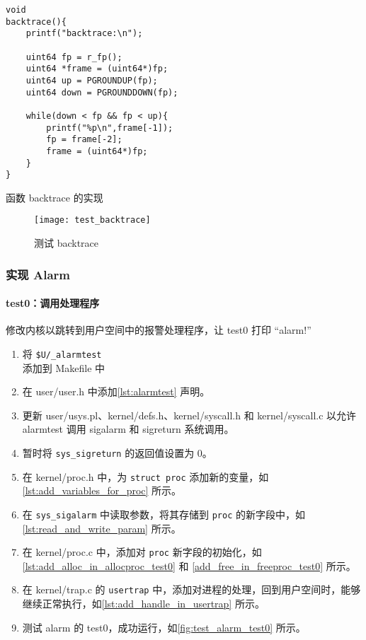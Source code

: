 \begin{listing}[!htb]
	\begin{verbatim}
void
backtrace(){
    printf("backtrace:\n");
   
    uint64 fp = r_fp();
    uint64 *frame = (uint64*)fp;
    uint64 up = PGROUNDUP(fp);
    uint64 down = PGROUNDDOWN(fp);

    while(down < fp && fp < up){
        printf("%p\n",frame[-1]);
        fp = frame[-2];
        frame = (uint64*)fp;
    }
}
	\end{verbatim}
	\caption{函数 backtrace 的实现}\label{lst:backtrace}
\end{listing}

\begin{figure}[!htb]
	\centering
	\texttt{[image: test\_backtrace]}
	\caption{测试 backtrace}
	\label{fig:test_backtrace}
\end{figure}

\subsubsection{实现 Alarm}

\paragraph{test0：调用处理程序}

修改内核以跳转到用户空间中的报警处理程序，让 test0 打印 “alarm!”

\begin{enumerate}
    \item 将 \texttt{\$U/\_alarmtest\\} 添加到 Makefile 中
	\item 在 user/user.h 中添加\cref{lst:alarmtest} 声明。
	\item 更新 user/usys.pl、kernel/defs.h、kernel/syscall.h 和 kernel/syscall.c 以允许 alarmtest 调用 sigalarm 和 sigreturn 系统调用。
	\item 暂时将 \texttt{sys\_sigreturn} 的返回值设置为 0。
	\item 在 kernel/proc.h 中，为 \texttt{struct proc} 添加新的变量，如\cref{lst:add_variables_for_proc} 所示。
	\item 在 \texttt{sys\_sigalarm} 中读取参数，将其存储到 \texttt{proc} 的新字段中，如\cref{lst:read_and_write_param} 所示。
	\item 在 kernel/proc.c 中，添加对 \texttt{proc} 新字段的初始化，如\cref{lst:add_alloc_in_allocproc_test0} 和 \cref{add_free_in_freeproc_test0} 所示。
	\item 在 kernel/trap.c 的 \texttt{usertrap} 中，添加对进程的处理，回到用户空间时，能够继续正常执行，如\cref{lst:add_handle_in_usertrap} 所示。
	\item 测试 alarm 的 test0，成功运行，如\cref{fig:test_alarm_test0} 所示。
\end{enumerate}

